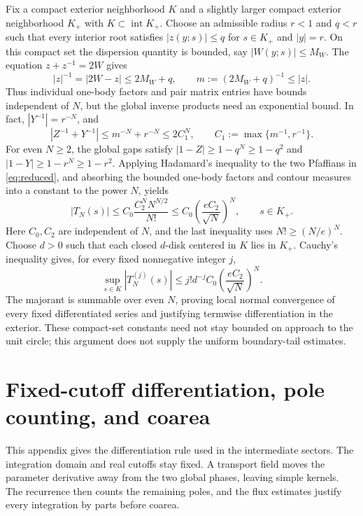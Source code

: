 \documentclass[11pt]{article}
\numberwithin{equation}{section}
\theoremstyle{definition}
\begin{document}
Fix a compact exterior neighborhood \(K\) and a slightly larger
compact exterior neighborhood \(K_+\) with
\(K\subset\operatorname{int}K_+\). Choose an admissible radius
\(r<1\) and \(q<r\) such that every interior root satisfies
\(|z(y;s)|\le q\) for \(s\in K_+\) and \(|y|=r\).
On this compact set the dispersion quantity is bounded, say
\(|W(y;s)|\le M_W\). The equation \(z+z^{-1}=2W\) gives
\[
 |z|^{-1}=|2W-z|\le 2M_W+q,
 \qquad m:=(2M_W+q)^{-1}\le |z|.
\]
Thus individual one-body factors and pair matrix entries have bounds
independent of \(N\), but the global inverse products need an
exponential bound. In fact, \(|Y^{-1}|=r^{-N}\), and
\[
 |Z^{-1}+Y^{-1}|\le m^{-N}+r^{-N}\le 2C_1^N,
 \qquad C_1:=\max\{m^{-1},r^{-1}\}.
\]
For even \(N\ge2\), the global gaps satisfy
\(|1-Z|\ge1-q^N\ge1-q^2\) and
\(|1-Y|\ge1-r^N\ge1-r^2\).
Applying Hadamard's inequality to the two Pfaffians in
\eqref{eq:reduced}, and absorbing the bounded one-body factors and
contour measures into a constant to the power \(N\), yields
\[
 |T_N(s)|\le C_0\frac{C_2^N N^{N/2}}{N!}
       \le C_0\left(\frac{eC_2}{\sqrt N}\right)^N,
 \qquad s\in K_+.
\]
Here \(C_0,C_2\) are independent of \(N\), and the last inequality
uses \(N!\ge(N/e)^N\).
Choose \(d>0\) such that each closed \(d\)-disk centered in \(K\)
lies in \(K_+\). Cauchy's inequality gives, for every fixed
nonnegative integer \(j\),
\[
 \sup_{s\in K}|T_N^{(j)}(s)|
 \le j!d^{-j}C_0\left(\frac{eC_2}{\sqrt N}\right)^N.
\]
The majorant is summable over even \(N\), proving local normal
convergence of every fixed differentiated series and justifying
termwise differentiation in the exterior. These compact-set
constants need not stay bounded on approach to the unit circle;
this argument does not supply the uniform boundary-tail estimates.



\section{Fixed-cutoff differentiation, pole counting, and coarea}
\label{app:lie}

This appendix gives the differentiation rule used in the intermediate
sectors. The integration domain and real cutoffs stay fixed. A transport
field moves the parameter derivative away from the two global phases,
leaving simple kernels. The recurrence then counts the remaining poles,
and the flux estimates justify every integration by parts before coarea.
\end{document}
